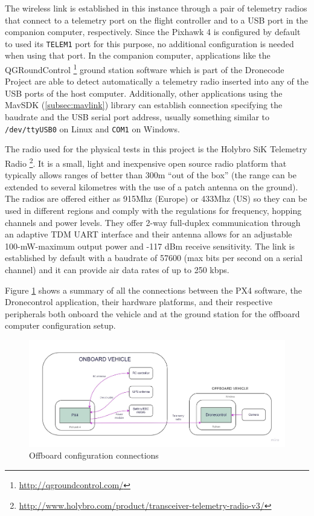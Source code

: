 The wireless link is established in this instance through a pair of telemetry radios that connect to a telemetry port on the flight controller and to a USB port in the companion computer, respectively.
Since the Pixhawk 4 is configured by default to used its \texttt{TELEM1} port for this purpose, no additional configuration is needed when using that port.
In the companion computer, applications like the QGRoundControl \footnote{\url{http://qgroundcontrol.com/}} ground station software which is part of the Dronecode Project are able to detect automatically a telemetry radio inserted into any of the USB ports of the host computer.
Additionally, other applications using the MavSDK (\ref{subsec:mavlink}) library can establish connection specifying the baudrate and the USB serial port address, usually something similar to \texttt{/dev/ttyUSB0} on Linux and \texttt{COM1} on Windows.

The radio used for the physical tests in this project is the Holybro SiK Telemetry Radio \footnote{\url{http://www.holybro.com/product/transceiver-telemetry-radio-v3/}}.
It is a small, light and inexpensive open source radio platform that typically allows ranges of better than 300m “out of the box” (the range can be extended to several kilometres with the use of a patch antenna on the ground).
The radios are offered either as 915Mhz (Europe) or 433Mhz (US) so they can be used in different regions and comply with the regulations for frequency, hopping channels and power levels.
They offer 2-way full-duplex communication through an adaptive TDM UART interface and their antenna allows for an adjustable 100-mW-maximum output power and -117 dBm receive sensitivity.
The link is established by default with a baudrate of 57600 (max bits per second on a serial channel) and it can provide air data rates of up to 250 kbps.

Figure \ref{fig:offboard-config} shows a summary of all the connections between the PX4 software, the Dronecontrol application, their hardware platforms, and their respective peripherals both onboard the vehicle and at the ground station for the offboard computer configuration setup.
\begin{figure}
  \centering
  \includegraphics[width=\textwidth,keepaspectratio]{img/offboard-diagram.jpg}
  \caption{Offboard configuration connections}
  \label{fig:offboard-config}
\end{figure}

